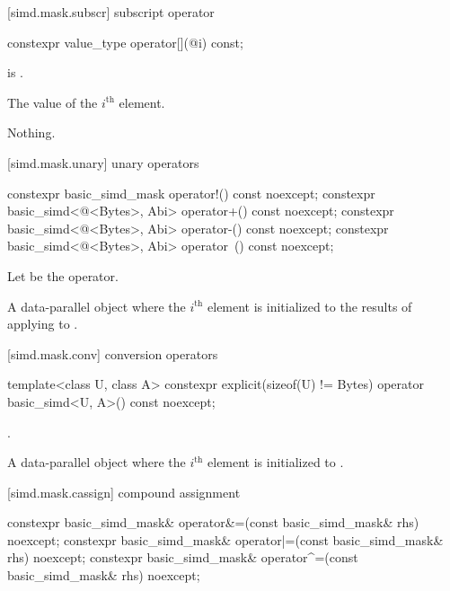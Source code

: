 [simd.mask.subscr]{ subscript operator}

\begin{itemdecl}
constexpr value_type operator[](@\simdsizetype@ i) const;
\end{itemdecl}

\begin{itemdescr}
  \pnum\expects
   is .

  \pnum\returns
  The value of the $i^\text{th}$ element.

  \pnum\throws Nothing.
\end{itemdescr}

[simd.mask.unary]{ unary operators}

\begin{itemdecl}
constexpr basic_simd_mask operator!() const noexcept;
constexpr basic_simd<@\integerfrom@<Bytes>, Abi> operator+() const noexcept;
constexpr basic_simd<@\integerfrom@<Bytes>, Abi> operator-() const noexcept;
constexpr basic_simd<@\integerfrom@<Bytes>, Abi> operator~() const noexcept;
\end{itemdecl}

\begin{itemdescr}
  \pnum Let \op{} be the operator.

  \pnum\returns
  A data-parallel object where the $i^\text{th}$ element is initialized to the results of applying
  \op{} to  \foralli.
\end{itemdescr}

[simd.mask.conv]{ conversion operators}

\begin{itemdecl}
template<class U, class A>
  constexpr explicit(sizeof(U) != Bytes) operator basic_simd<U, A>() const noexcept;
\end{itemdecl}

\begin{itemdescr}
  \pnum\constraints
  .

  \pnum\returns
  A data-parallel object where the $i^\text{th}$ element is initialized to
  .
\end{itemdescr}

[simd.mask.cassign]{ compound assignment}

\begin{itemdecl}
constexpr basic_simd_mask& operator&=(const basic_simd_mask& rhs) noexcept;
constexpr basic_simd_mask& operator|=(const basic_simd_mask& rhs) noexcept;
constexpr basic_simd_mask& operator^=(const basic_simd_mask& rhs) noexcept;
\end{itemdecl}

